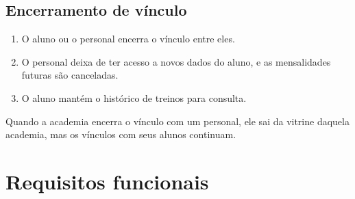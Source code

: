 \subsection{Encerramento de vínculo}
\begin{enumerate}
  \item O aluno ou o personal encerra o vínculo entre eles.
  \item O personal deixa de ter acesso a novos dados do aluno, e as mensalidades futuras são canceladas.
  \item O aluno mantém o histórico de treinos para consulta.
\end{enumerate}

Quando a academia encerra o vínculo com um personal, ele sai da vitrine daquela academia, mas os vínculos com seus alunos continuam.

\section{Requisitos funcionais}


